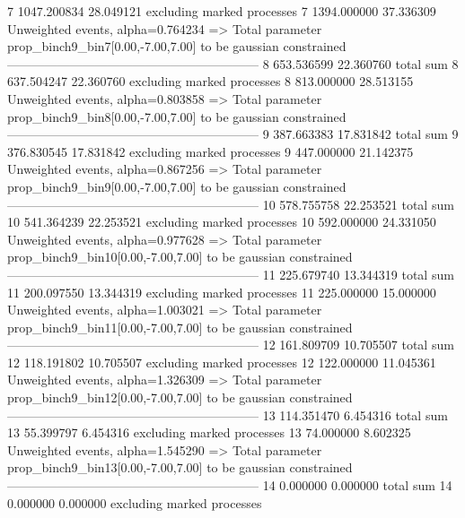 7          1047.200834     28.049121       excluding marked processes    
7          1394.000000     37.336309       Unweighted events, alpha=0.764234
  => Total parameter prop_binch9_bin7[0.00,-7.00,7.00] to be gaussian constrained
------------------------------------------------------------
8          653.536599      22.360760       total sum                     
8          637.504247      22.360760       excluding marked processes    
8          813.000000      28.513155       Unweighted events, alpha=0.803858
  => Total parameter prop_binch9_bin8[0.00,-7.00,7.00] to be gaussian constrained
------------------------------------------------------------
9          387.663383      17.831842       total sum                     
9          376.830545      17.831842       excluding marked processes    
9          447.000000      21.142375       Unweighted events, alpha=0.867256
  => Total parameter prop_binch9_bin9[0.00,-7.00,7.00] to be gaussian constrained
------------------------------------------------------------
10         578.755758      22.253521       total sum                     
10         541.364239      22.253521       excluding marked processes    
10         592.000000      24.331050       Unweighted events, alpha=0.977628
  => Total parameter prop_binch9_bin10[0.00,-7.00,7.00] to be gaussian constrained
------------------------------------------------------------
11         225.679740      13.344319       total sum                     
11         200.097550      13.344319       excluding marked processes    
11         225.000000      15.000000       Unweighted events, alpha=1.003021
  => Total parameter prop_binch9_bin11[0.00,-7.00,7.00] to be gaussian constrained
------------------------------------------------------------
12         161.809709      10.705507       total sum                     
12         118.191802      10.705507       excluding marked processes    
12         122.000000      11.045361       Unweighted events, alpha=1.326309
  => Total parameter prop_binch9_bin12[0.00,-7.00,7.00] to be gaussian constrained
------------------------------------------------------------
13         114.351470      6.454316        total sum                     
13         55.399797       6.454316        excluding marked processes    
13         74.000000       8.602325        Unweighted events, alpha=1.545290
  => Total parameter prop_binch9_bin13[0.00,-7.00,7.00] to be gaussian constrained
------------------------------------------------------------
14         0.000000        0.000000        total sum                     
14         0.000000        0.000000        excluding marked processes    
